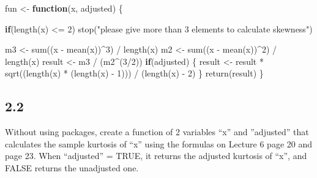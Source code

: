 \documentclass[
]{article}
\newenvironment{Shaded}{\begin{snugshade}}{\end{snugshade}}
\newcommand{\ControlFlowTok}[1]{\textcolor[rgb]{0.13,0.29,0.53}{\textbf{#1}}}
\newcommand{\DecValTok}[1]{\textcolor[rgb]{0.00,0.00,0.81}{#1}}
\newcommand{\FunctionTok}[1]{\textcolor[rgb]{0.00,0.00,0.00}{#1}}
\newcommand{\NormalTok}[1]{#1}
\newcommand{\OtherTok}[1]{\textcolor[rgb]{0.56,0.35,0.01}{#1}}
\newcommand{\SpecialCharTok}[1]{\textcolor[rgb]{0.00,0.00,0.00}{#1}}
\newcommand{\StringTok}[1]{\textcolor[rgb]{0.31,0.60,0.02}{#1}}
\begin{document}
\begin{Shaded}
\begin{Highlighting}[]
\NormalTok{fun }\OtherTok{\textless{}{-}} \ControlFlowTok{function}\NormalTok{(x, adjusted) \{}

  \ControlFlowTok{if}\NormalTok{(}\FunctionTok{length}\NormalTok{(x) }\SpecialCharTok{\textless{}=} \DecValTok{2}\NormalTok{) }
    \FunctionTok{stop}\NormalTok{(}\StringTok{"please give more than 3 elements to calculate skewness"}\NormalTok{)}

\NormalTok{  m3 }\OtherTok{\textless{}{-}} \FunctionTok{sum}\NormalTok{((x }\SpecialCharTok{{-}} \FunctionTok{mean}\NormalTok{(x))}\SpecialCharTok{\^{}}\DecValTok{3}\NormalTok{) }\SpecialCharTok{/} \FunctionTok{length}\NormalTok{(x)}
\NormalTok{  m2 }\OtherTok{\textless{}{-}} \FunctionTok{sum}\NormalTok{((x }\SpecialCharTok{{-}} \FunctionTok{mean}\NormalTok{(x))}\SpecialCharTok{\^{}}\DecValTok{2}\NormalTok{) }\SpecialCharTok{/} \FunctionTok{length}\NormalTok{(x) }
\NormalTok{  result }\OtherTok{\textless{}{-}}\NormalTok{ m3 }\SpecialCharTok{/}\NormalTok{ (m2}\SpecialCharTok{\^{}}\NormalTok{(}\DecValTok{3}\SpecialCharTok{/}\DecValTok{2}\NormalTok{))}
  \ControlFlowTok{if}\NormalTok{(adjusted) \{}
\NormalTok{    result }\OtherTok{\textless{}{-}}\NormalTok{ result }\SpecialCharTok{*} \FunctionTok{sqrt}\NormalTok{((}\FunctionTok{length}\NormalTok{(x) }\SpecialCharTok{*}\NormalTok{ (}\FunctionTok{length}\NormalTok{(x) }\SpecialCharTok{{-}} \DecValTok{1}\NormalTok{))) }\SpecialCharTok{/}\NormalTok{ (}\FunctionTok{length}\NormalTok{(x) }\SpecialCharTok{{-}} \DecValTok{2}\NormalTok{)}
\NormalTok{  \}}
  \FunctionTok{return}\NormalTok{(result)}
\NormalTok{\}}
\end{Highlighting}
\end{Shaded}

\hypertarget{section-8}{%
\subsection{2.2}\label{section-8}}

Without using packages, create a function of 2 variables ``x'' and
''adjusted'' that calculates the sample kurtosis of ``x'' using the
formulas on Lecture 6 page 20 and page 23. When ``adjusted'' = TRUE, it
returns the adjusted kurtosis of ``x'', and FALSE returns the unadjusted
one.
\end{document}

